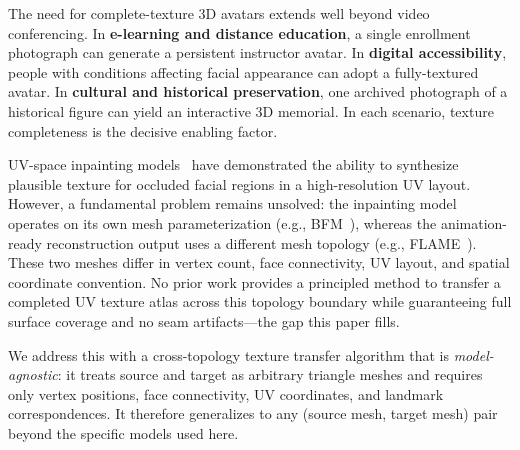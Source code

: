 \documentclass[conference]{IEEEtran}
\begin{document}
The need for complete-texture 3D avatars extends well beyond video
conferencing. In \textbf{e-learning and distance education}, a single
enrollment photograph can generate a persistent instructor avatar. In
\textbf{digital accessibility}, people with conditions affecting facial
appearance can adopt a fully-textured avatar. In \textbf{cultural and
historical preservation}, one archived photograph of a historical figure can
yield an interactive 3D memorial. In each scenario, texture completeness is the
decisive enabling factor.

UV-space inpainting models~\cite{bai2023uvidm} have demonstrated the ability
to synthesize plausible texture for occluded facial regions in a high-resolution
UV layout. However, a fundamental problem remains unsolved: the inpainting model
operates on its own mesh parameterization (e.g., BFM~\cite{paysan2009bfm}),
whereas the animation-ready reconstruction output uses a different mesh topology
(e.g., FLAME~\cite{li2017learning}). These two meshes differ in vertex count,
face connectivity, UV layout, and spatial coordinate convention. No prior work
provides a principled method to transfer a completed UV texture atlas across
this topology boundary while guaranteeing full surface coverage and no seam
artifacts---the gap this paper fills.

We address this with a cross-topology texture transfer algorithm that is
\emph{model-agnostic}: it treats source and target as arbitrary triangle meshes
and requires only vertex positions, face connectivity, UV coordinates, and
landmark correspondences. It therefore generalizes to any (source mesh,
target mesh) pair beyond the specific models used here.
\end{document}
